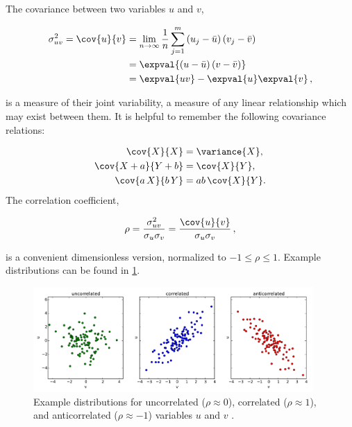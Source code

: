 The covariance between two variables $u$ and $v$,

\begin{equation}\label{eq:stats:covar}
\begin{split}
\sigma_{uv}^{2} = \cov{u}{v} &= \lim_{n\to\infty}\frac{1}{n}\sum_{j=1}^{m}\left(u_{j}-\bar{u}\right)\left(v_{j}-\bar{v}\right) \\
&= \expval{\left(u-\bar{u}\right)\left(v-\bar{v}\right)} \\
&= \expval{uv} - \expval{u}\expval{v}\,,
\end{split}
\end{equation}

\noindent is a measure of their joint variability,
\ie a measure of any linear relationship which may exist between them.
It is helpful to remember the following covariance relations:

\begin{subequations}\label{eq:stats:covar_relations}
\begin{align}
\cov{X}{X} &= \variance{X}, \label{eq:stats:covar_relations:var} \\
\cov{X + a}{Y + b} &= \cov{X}{Y}, \label{eq:stats:covar_relations:add} \\
\cov{a\,X}{b\,Y} &= ab\,\cov{X}{Y}. \label{eq:stats:covar_relations:mult}
\end{align}
\end{subequations}
The correlation coefficient,

\begin{equation}\label{eq:stats:corr}
\rho = \frac{\sigma_{uv}^{2}}{\sigma_{u}\sigma_{v}} = \frac{\cov{u}{v}}{\sigma_{u}\sigma_{v}}\,,
\end{equation}

\noindent is a convenient dimensionless version, normalized to $-1 \leq \rho \leq 1$.
Example distributions can be found in \cref{fig:stats:corr_ex}.

\begin{figure}
\centering
\includegraphics[width=0.95\textwidth]{figures/stats/corr_ex.pdf}
\caption{
Example distributions for
uncorrelated ($\rho \approx 0$),
correlated ($\rho \approx 1$),
and anticorrelated ($\rho \approx -1$)
variables $u$ and $v$ \cite{DougNotes}.
}
\label{fig:stats:corr_ex}
\end{figure}

